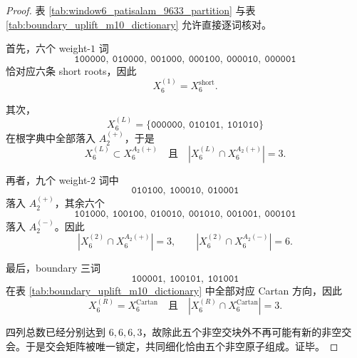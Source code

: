 \begin{proof}
表 \ref{tab:window6_patisalam_9633_partition} 与表 \ref{tab:boundary_uplift_m10_dictionary} 允许直接逐词核对。

首先，六个 weight-\(1\) 词
\[
\texttt{100000},\ \texttt{010000},\ \texttt{001000},\ \texttt{000100},\ \texttt{000010},\ \texttt{000001}
\]
恰对应六条 short roots，因此
\[
X_6^{(1)}=X_6^{\mathrm{short}}.
\]

其次，
\[
X_6^{(L)}=\{\texttt{000000},\ \texttt{010101},\ \texttt{101010}\}
\]
在根字典中全部落入 \(A_2^{(+)}\)，于是
\[
X_6^{(L)}\subset X_6^{A_2(+)}
\quad\text{且}\quad
|X_6^{(L)}\cap X_6^{A_2(+)}|=3.
\]

再者，九个 weight-\(2\) 词中
\[
\texttt{010100},\ \texttt{100010},\ \texttt{010001}
\]
落入 \(A_2^{(+)}\)，其余六个
\[
\texttt{101000},\ \texttt{100100},\ \texttt{010010},\ \texttt{001010},\ \texttt{001001},\ \texttt{000101}
\]
落入 \(A_2^{(-)}\)。因此
\[
|X_6^{(2)}\cap X_6^{A_2(+)}|=3,
\qquad
|X_6^{(2)}\cap X_6^{A_2(-)}|=6.
\]

最后，boundary 三词
\[
\texttt{100001},\ \texttt{100101},\ \texttt{101001}
\]
在表 \ref{tab:boundary_uplift_m10_dictionary} 中全部对应 Cartan 方向，因此
\[
X_6^{(R)}=X_6^{\mathrm{Cartan}}
\quad\text{且}\quad
|X_6^{(R)}\cap X_6^{\mathrm{Cartan}}|=3.
\]

四列总数已经分别达到 \(6,6,6,3\)，故除此五个非空交块外不再可能有新的非空交会。于是交会矩阵被唯一锁定，共同细化恰由五个非空原子组成。证毕。
\end{proof}

